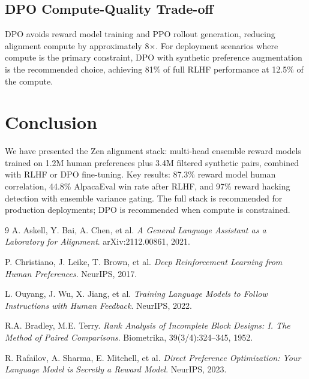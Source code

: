 \documentclass[11pt,a4paper]{article}
\begin{document}
\subsection{DPO Compute-Quality Trade-off}

DPO avoids reward model training and PPO rollout generation, reducing alignment compute
by approximately 8$\times$. For deployment scenarios where compute is the primary
constraint, DPO with synthetic preference augmentation is the recommended choice,
achieving 81\% of full RLHF performance at 12.5\% of the compute.

\section{Conclusion}
\label{sec:conclusion}

We have presented the Zen alignment stack: multi-head ensemble reward models trained
on 1.2M human preferences plus 3.4M filtered synthetic pairs, combined with RLHF or
DPO fine-tuning. Key results: 87.3\% reward model human correlation, 44.8\% AlpacaEval
win rate after RLHF, and 97\% reward hacking detection with ensemble variance gating.
The full stack is recommended for production deployments; DPO is recommended when
compute is constrained.

\begin{thebibliography}{9}
A. Askell, Y. Bai, A. Chen, et al.
\textit{A General Language Assistant as a Laboratory for Alignment}.
arXiv:2112.00861, 2021.

P. Christiano, J. Leike, T. Brown, et al.
\textit{Deep Reinforcement Learning from Human Preferences}.
NeurIPS, 2017.

L. Ouyang, J. Wu, X. Jiang, et al.
\textit{Training Language Models to Follow Instructions with Human Feedback}.
NeurIPS, 2022.

R.A. Bradley, M.E. Terry.
\textit{Rank Analysis of Incomplete Block Designs: I. The Method of Paired Comparisons}.
Biometrika, 39(3/4):324--345, 1952.

R. Rafailov, A. Sharma, E. Mitchell, et al.
\textit{Direct Preference Optimization: Your Language Model is Secretly a Reward Model}.
NeurIPS, 2023.
\end{thebibliography}
\end{document}
